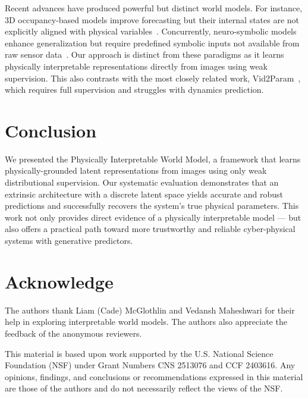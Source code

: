 \documentclass[nonacm,sigconf]{acmart}
\begin{document}
Recent advances have produced powerful but distinct world models. For instance, 3D occupancy-based models improve forecasting but their internal states are not explicitly aligned with physical variables~\cite[]{zheng2024occworld,min2023uniworld,yan2024renderworld,zuo2024gaussianworld}. Concurrently, neuro-symbolic models enhance generalization but require predefined symbolic inputs not available from raw sensor data~\cite[]{balloch2023neuro,liang2024visualpredicator}. Our approach is distinct from these paradigms as it learns physically interpretable representations directly from images using weak supervision. This also contrasts with the most closely related work, Vid2Param~\cite[]{asenov2019vid2param}, which requires full supervision and struggles with dynamics prediction.







\section{Conclusion}\label{sec:conclusion}
We presented the Physically Interpretable World Model, a framework that learns physically-grounded latent representations from images using only weak distributional supervision. Our systematic evaluation demonstrates that an extrinsic architecture with a discrete latent space yields accurate and robust predictions and successfully recovers the system's true physical parameters. This work not only provides direct evidence of a physically interpretable model --- but also offers a practical path toward more trustworthy and reliable cyber-physical systems with generative predictors. 


\section*{Acknowledge}\label{sec:ack}
 
The authors thank Liam (Cade) McGlothlin and Vedansh Maheshwari for their help in exploring interpretable world models. The authors also appreciate the feedback of the anonymous reviewers. 

This material is based upon work supported by the U.S. National Science Foundation (NSF) under Grant Numbers CNS 2513076 and CCF 2403616. Any opinions, findings, and conclusions or recommendations expressed in this material are those of the authors and do not necessarily reflect the views of the NSF.
\end{document}
